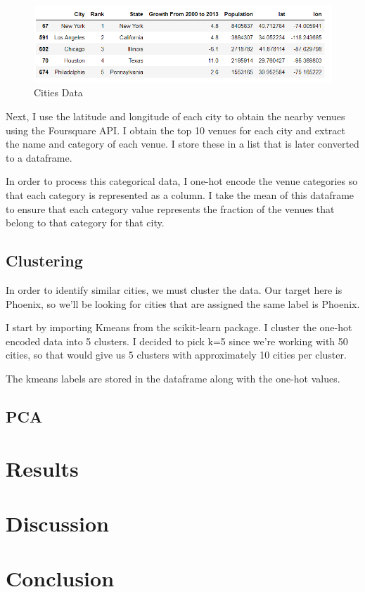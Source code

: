 \documentclass[12pt, a4paper]{report}
\begin{document}
\begin{figure}[h]
\includegraphics[]{cities_data}
\caption{Cities Data}
\end{figure}

Next, I use the latitude and longitude of each city to obtain the nearby venues using the Foursquare API. I obtain the top 10 venues for each city and extract the name and category of each venue. I store these in a list that is later converted to a dataframe. 

In order to process this categorical data, I one-hot encode the venue categories so that each category is represented as a column. I take the mean of this dataframe to ensure that each category value represents the fraction of the venues that belong to that category for that city. 

\subsection*{Clustering}
In order to identify similar cities, we must cluster the data. Our target here is Phoenix, so we'll be looking for cities that are assigned the same label is Phoenix. 

I start by importing Kmeans from the scikit-learn package. I cluster the one-hot encoded data into 5 clusters. I decided to pick k=5 since we're working with 50 cities, so that would give us 5 clusters with approximately 10 cities per cluster. 

The kmeans labels are stored in the dataframe along with the one-hot values. 

\subsection*{PCA}

\section*{Results}

\section*{Discussion}

\section*{Conclusion}
\end{document}
